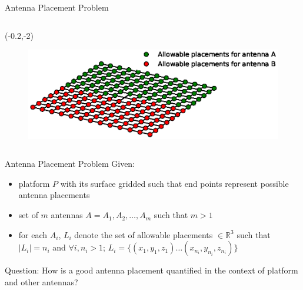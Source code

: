 \documentclass{beamer}
\begin{document}
\begin{frame}{Antenna Placement Problem}
\begin{columns}
{            \begin{textblock}{3}(-0.2,-2)
                \begin{figure}
                    \includegraphics[trim=170 165 70 145, clip, scale=0.4]{../paper/FIG/tc1_intro}
                \end{figure}\end{textblock}
        }
    \end{columns}
\end{frame}

\begin{frame}[t]{Antenna Placement Problem}
    Given:
\begin{itemize} \itemsep1.5em
        \item platform $P$ with its surface gridded such that end points represent possible antenna placements
        \item set of  $m$ antennas $A = {A_1, A_2, \dots, A_m}$ such that $m > 1$
        \item for each $A_i$, $L_i$ denote the set of allowable placements $\in \mathbb R^3$ such that $\mid L_i \mid = n_i$ and $\forall i, n_i > 1$; $L_i = \{(x_{1}, y_{1}, z_{1}) \dots (x_{n_i}, y_{n_i}, z_{n_i})\}$
    \end{itemize}
    \vspace{10px}
    \centering{}
\end{frame}

\begin{frame}{\null}
    \begin{tcolorbox}[colback=green!5]
        \centering
        Question: How is a good antenna placement quantified in the context of platform and other antennas?
    \end{tcolorbox}
\end{frame}
\end{document}
